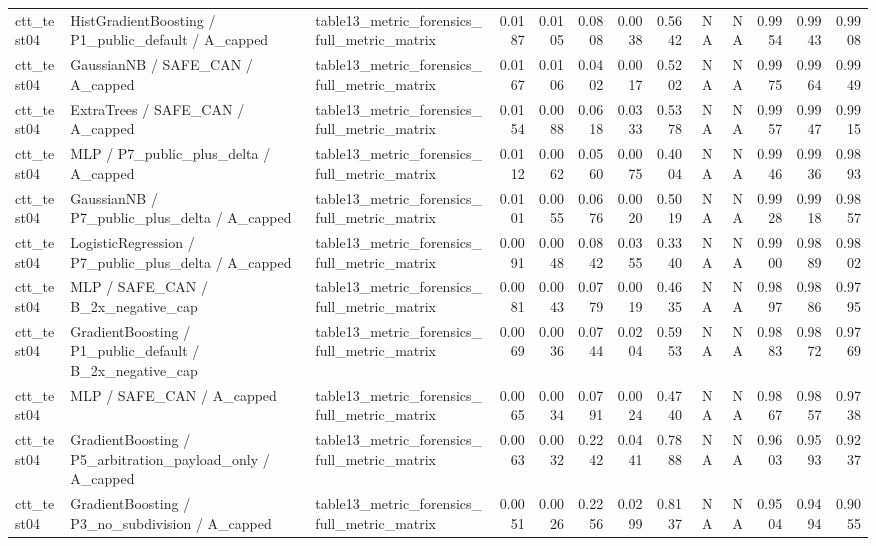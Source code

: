 \begin{tabular}{lllrrrrrrrrrr}
ctt\_test04 & HistGradientBoosting / P1\_public\_default / A\_capped & table13\_metric\_forensics\_full\_metric\_matrix & 0.0187 & 0.0105 & 0.0808 & 0.0038 & 0.5642 & NA & NA & 0.9954 & 0.9943 & 0.9908 \\
ctt\_test04 & GaussianNB / SAFE\_CAN / A\_capped & table13\_metric\_forensics\_full\_metric\_matrix & 0.0167 & 0.0106 & 0.0402 & 0.0017 & 0.5202 & NA & NA & 0.9975 & 0.9964 & 0.9949 \\
ctt\_test04 & ExtraTrees / SAFE\_CAN / A\_capped & table13\_metric\_forensics\_full\_metric\_matrix & 0.0154 & 0.0088 & 0.0618 & 0.0333 & 0.5378 & NA & NA & 0.9957 & 0.9947 & 0.9915 \\
ctt\_test04 & MLP / P7\_public\_plus\_delta / A\_capped & table13\_metric\_forensics\_full\_metric\_matrix & 0.0112 & 0.0062 & 0.0560 & 0.0075 & 0.4004 & NA & NA & 0.9946 & 0.9936 & 0.9893 \\
ctt\_test04 & GaussianNB / P7\_public\_plus\_delta / A\_capped & table13\_metric\_forensics\_full\_metric\_matrix & 0.0101 & 0.0055 & 0.0676 & 0.0020 & 0.5019 & NA & NA & 0.9928 & 0.9918 & 0.9857 \\
ctt\_test04 & LogisticRegression / P7\_public\_plus\_delta / A\_capped & table13\_metric\_forensics\_full\_metric\_matrix & 0.0091 & 0.0048 & 0.0842 & 0.0355 & 0.3340 & NA & NA & 0.9900 & 0.9889 & 0.9802 \\
ctt\_test04 & MLP / SAFE\_CAN / B\_2x\_negative\_cap & table13\_metric\_forensics\_full\_metric\_matrix & 0.0081 & 0.0043 & 0.0779 & 0.0019 & 0.4635 & NA & NA & 0.9897 & 0.9886 & 0.9795 \\
ctt\_test04 & GradientBoosting / P1\_public\_default / B\_2x\_negative\_cap & table13\_metric\_forensics\_full\_metric\_matrix & 0.0069 & 0.0036 & 0.0744 & 0.0204 & 0.5953 & NA & NA & 0.9883 & 0.9872 & 0.9769 \\
ctt\_test04 & MLP / SAFE\_CAN / A\_capped & table13\_metric\_forensics\_full\_metric\_matrix & 0.0065 & 0.0034 & 0.0791 & 0.0024 & 0.4740 & NA & NA & 0.9867 & 0.9857 & 0.9738 \\
ctt\_test04 & GradientBoosting / P5\_arbitration\_payload\_only / A\_capped & table13\_metric\_forensics\_full\_metric\_matrix & 0.0063 & 0.0032 & 0.2242 & 0.0441 & 0.7888 & NA & NA & 0.9603 & 0.9593 & 0.9237 \\
ctt\_test04 & GradientBoosting / P3\_no\_subdivision / A\_capped & table13\_metric\_forensics\_full\_metric\_matrix & 0.0051 & 0.0026 & 0.2256 & 0.0299 & 0.8137 & NA & NA & 0.9504 & 0.9494 & 0.9055 \\

\end{tabular}
